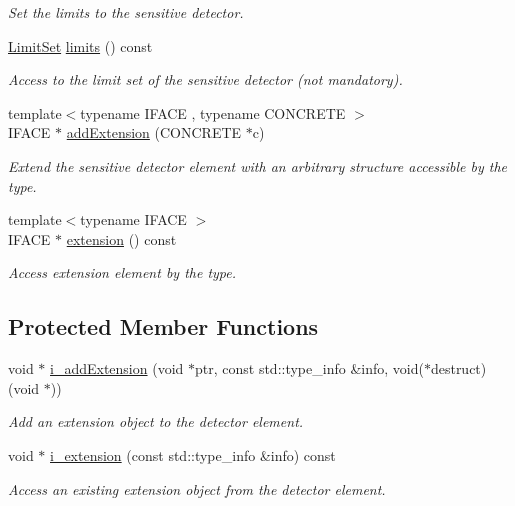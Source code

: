 \begin{DoxyCompactItemize}
\begin{DoxyCompactList}\small\item\em Set the limits to the sensitive detector. \item\end{DoxyCompactList}\item 
\hyperlink{class_d_d4hep_1_1_geometry_1_1_limit_set}{LimitSet} \hyperlink{class_d_d4hep_1_1_geometry_1_1_sensitive_detector_a668c56c4c046721d0732de64df8cea14}{limits} () const 
\begin{DoxyCompactList}\small\item\em Access to the limit set of the sensitive detector (not mandatory). \item\end{DoxyCompactList}\item 
{\footnotesize template$<$typename IFACE , typename CONCRETE $>$ }\\IFACE $\ast$ \hyperlink{class_d_d4hep_1_1_geometry_1_1_sensitive_detector_aa7ac8b6ab4edba549e70596ab1fdd6d5}{addExtension} (CONCRETE $\ast$c)
\begin{DoxyCompactList}\small\item\em Extend the sensitive detector element with an arbitrary structure accessible by the type. \item\end{DoxyCompactList}\item 
{\footnotesize template$<$typename IFACE $>$ }\\IFACE $\ast$ \hyperlink{class_d_d4hep_1_1_geometry_1_1_sensitive_detector_a454154c8be26b2919d4b53c5ed738a57}{extension} () const 
\begin{DoxyCompactList}\small\item\em Access extension element by the type. \item\end{DoxyCompactList}\end{DoxyCompactItemize}
\subsection*{Protected Member Functions}
\begin{DoxyCompactItemize}
\item 
void $\ast$ \hyperlink{class_d_d4hep_1_1_geometry_1_1_sensitive_detector_a0b0b5adaec49d7ff0ed3b9e39d54cb4f}{i\_\-addExtension} (void $\ast$ptr, const std::type\_\-info \&info, void($\ast$destruct)(void $\ast$))
\begin{DoxyCompactList}\small\item\em Add an extension object to the detector element. \item\end{DoxyCompactList}\item 
void $\ast$ \hyperlink{class_d_d4hep_1_1_geometry_1_1_sensitive_detector_a194eef5ee2865d3fe6b452fe057a617b}{i\_\-extension} (const std::type\_\-info \&info) const 
\begin{DoxyCompactList}\small\item\em Access an existing extension object from the detector element. \item\end{DoxyCompactList}\end{DoxyCompactItemize}
